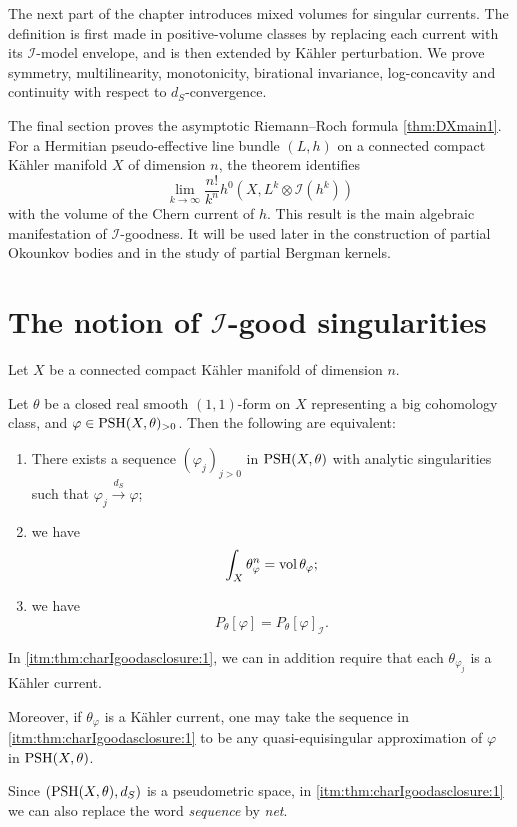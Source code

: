 The next part of the chapter introduces mixed volumes for singular currents. The definition is first made in positive-volume classes by replacing each current with its $\mathcal I$-model envelope, and is then extended by K\"ahler perturbation. We prove symmetry, multilinearity, monotonicity, birational invariance, log-concavity and continuity with respect to $d_S$-convergence.

The final section proves the asymptotic Riemann--Roch formula \cref{thm:DXmain1}. For a Hermitian pseudo-effective line bundle $(L,h)$ on a connected compact K\"ahler manifold $X$ of dimension $n$, the theorem identifies
\[
    \lim_{k\to\infty}\frac{n!}{k^n}
    h^0\left(X,L^k\otimes\mathcal I(h^k)\right)
\]
with the volume of the Chern current of $h$. This result is the main algebraic manifestation of $\mathcal I$-goodness. It will be used later in the construction of partial Okounkov bodies and in the study of partial Bergman kernels.

\section{The notion of \texorpdfstring{$\mathcal{I}$}{I}-good singularities}\label{sec:Igoodnotion}

Let $X$ be a connected compact Kähler manifold of dimension $n$.



\begin{theorem}\label{thm:charIgoodasclosure}
    Let $\theta$ be a closed real smooth $(1,1)$-form on $X$ representing a big cohomology class, and $\varphi\in \mathrm{PSH}(X,\theta)_{>0}$. Then the following are equivalent:
    \begin{enumerate}
        \item\label{itm:thm:charIgoodasclosure:1} There exists a sequence $(\varphi_j)_{j>0}$ in $\mathrm{PSH}(X,\theta)$ with analytic singularities such that $\varphi_j\xrightarrow{d_S}\varphi$;
        \item\label{itm:thm:charIgoodasclosure:2} we have
        \begin{equation}\label{eq:nppmassequalvolume}
            \int_X \theta_{\varphi}^n=\operatorname{vol} \theta_{\varphi};
        \end{equation}
        \item\label{itm:thm:charIgoodasclosure:3} we have
            \begin{equation}\label{eq:PequpI}
                P_{\theta}[\varphi]=P_{\theta}[\varphi]_{\mathcal{I}}.
            \end{equation}
    \end{enumerate}
    In \ref{itm:thm:charIgoodasclosure:1}, we can in addition require that each $\theta_{\varphi_j}$ is a Kähler current.

    Moreover, if $\theta_{\varphi}$ is a Kähler current, one may take the sequence in \ref{itm:thm:charIgoodasclosure:1} to be any quasi-equisingular approximation of $\varphi$ in $\mathrm{PSH}(X,\theta)$.
\end{theorem}
Since $(\mathrm{PSH}(X,\theta),d_S)$ is a pseudometric space, in \ref{itm:thm:charIgoodasclosure:1} we can also replace the word \emph{sequence} by \emph{net}.

